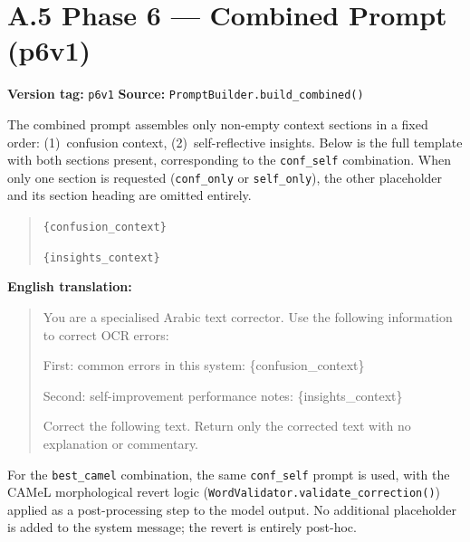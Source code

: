 \section*{A.5 \quad Phase 6 --- Combined Prompt (p6v1)}

\textbf{Version tag:} \texttt{p6v1} \quad
\textbf{Source:} \texttt{PromptBuilder.build\_combined()}

\noindent
The combined prompt assembles only non-empty context sections in a fixed
order: (1)~confusion context, (2)~self-reflective insights. Below is the
full template with both sections present, corresponding to the
\texttt{conf\_self} combination. When only one section is requested
(\texttt{conf\_only} or \texttt{self\_only}), the other placeholder
and its section heading are omitted entirely.

\begin{quote}\itshape

  \texttt{\{confusion\_context\}}

  \texttt{\{insights\_context\}}

\end{quote}

\textbf{English translation:}
\begin{quote}
  You are a specialised Arabic text corrector. Use the following information
  to correct OCR errors:

  First: common errors in this system:
  \{confusion\_context\}

  Second: self-improvement performance notes:
  \{insights\_context\}

  Correct the following text. Return only the corrected text with no
  explanation or commentary.
\end{quote}

\noindent
For the \texttt{best\_camel} combination, the same \texttt{conf\_self}
prompt is used, with the CAMeL morphological revert logic
(\texttt{WordValidator.validate\_correction()}) applied as a post-processing
step to the model output. No additional placeholder is added to the system
message; the revert is entirely post-hoc.
